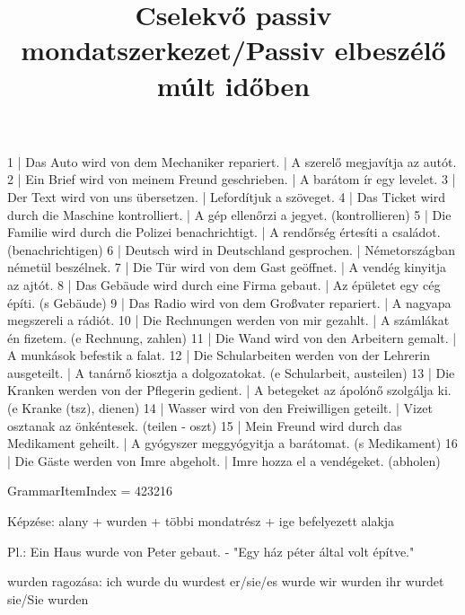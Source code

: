 \begin{exmp}
1 | Das Auto wird von dem Mechaniker repariert. | A szerelő megjavítja az autót.
2 | Ein Brief wird von meinem Freund geschrieben. | A barátom ír egy levelet.
3 | Der Text wird von uns übersetzen. | Lefordítjuk a szöveget.
4 | Das Ticket wird durch die Maschine kontrolliert. | A gép ellenőrzi a jegyet. (kontrollieren)
5 | Die Familie wird durch die Polizei benachrichtigt. | A rendőrség értesíti a családot. (benachrichtigen)
6 | Deutsch wird in Deutschland gesprochen. | Németországban németül beszélnek.
7 | Die Tür wird von dem Gast geöffnet. | A vendég kinyitja az ajtót.
8 | Das Gebäude wird durch eine Firma gebaut. | Az épületet egy cég építi. (s Gebäude)
9 | Das Radio wird von dem Großvater repariert. | A nagyapa megszereli a rádiót.
10 | Die Rechnungen werden von mir gezahlt. | A számlákat én fizetem. (e Rechnung, zahlen)
11 | Die Wand wird von den Arbeitern gemalt. | A munkások befestik a falat.
12 | Die Schularbeiten werden von der Lehrerin ausgeteilt. | A tanárnő kiosztja a dolgozatokat. (e Schularbeit, austeilen)
13 | Die Kranken werden von der Pflegerin gedient. | A betegeket az ápolónő szolgálja ki. (e Kranke (tsz), dienen)
14 | Wasser wird von den Freiwilligen geteilt. | Vizet osztanak az önkéntesek. (teilen - oszt)
15 | Mein Freund wird durch das Medikament geheilt. | A gyógyszer meggyógyitja a barátomat. (s Medikament)
16 | Die Gäste werden von Imre abgeholt. | Imre hozza el a vendégeket. (abholen)
\end{exmp}

\title{Cselekvő passiv mondatszerkezet/Passiv elbeszélő múlt időben}

GrammarItemIndex = 423216

\begin{desc}
Képzése: alany + wurden + többi mondatrész + ige befelyezett alakja

Pl.: Ein Haus wurde von Peter gebaut. - "Egy ház péter által volt építve."

wurden ragozása:
ich wurde
du wurdest
er/sie/es wurde
wir wurden
ihr wurdet
sie/Sie wurden
\end{desc}


